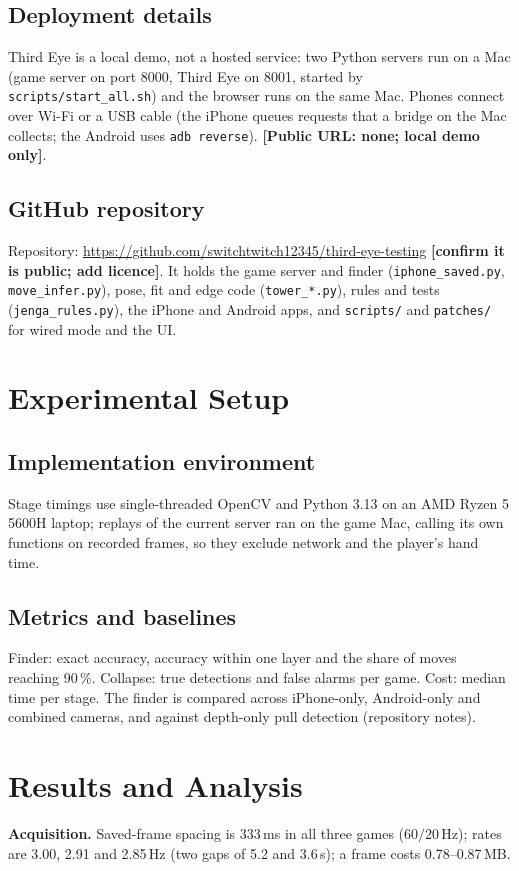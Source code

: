 \documentclass[12pt,a4paper]{article}
\newcommand{\code}[1]{\texttt{\small #1}}
\newcommand{\tbd}[1]{\textbf{[#1]}}
\begin{document}
\subsection{Deployment details}
Third Eye is a local demo, not a hosted service: two Python servers run on a Mac (game server on port 8000, Third Eye on 8001, started by \code{scripts/start\_all.sh}) and the browser runs on the same Mac. Phones connect over Wi-Fi or a USB cable (the iPhone queues requests that a bridge on the Mac collects; the Android uses \code{adb reverse}). \tbd{Public URL: none; local demo only}.
\subsection{GitHub repository}
Repository: \url{https://github.com/switchtwitch12345/third-eye-testing} \tbd{confirm it is public; add licence}. It holds the game server and finder (\code{iphone\_saved.py}, \code{move\_infer.py}), pose, fit and edge code (\code{tower\_*.py}), rules and tests (\code{jenga\_rules.py}), the iPhone and Android apps, and \code{scripts/} and \code{patches/} for wired mode and the UI.

\section{Experimental Setup}
\subsection{Implementation environment}
Stage timings use single-threaded OpenCV and Python 3.13 on an AMD Ryzen 5 5600H laptop; replays of the current server ran on the game Mac, calling its own functions on recorded frames, so they exclude network and the player's hand time.
\subsection{Metrics and baselines}
Finder: exact accuracy, accuracy within one layer and the share of moves reaching 90\,\%. Collapse: true detections and false alarms per game. Cost: median time per stage. The finder is compared across iPhone-only, Android-only and combined cameras, and against depth-only pull detection (repository notes).

\section{Results and Analysis}
\textbf{Acquisition.} Saved-frame spacing is 333\,ms in all three games ($60/20$\,Hz); rates are 3.00, 2.91 and 2.85\,Hz (two gaps of 5.2 and 3.6\,s); a frame costs 0.78--0.87\,MB.
\end{document}
